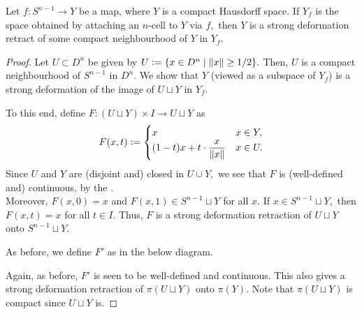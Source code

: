 \documentclass[12pt]{article}
\begin{document}
\begin{prop} \label{prop:lem217}
	Let $f:S^{n-1} \to Y$ be a map, where $Y$ is a compact Hausdorff space. If $Y_f$ is the space obtained by attaching an $n$-cell to $Y$ via $f,$ then $Y$ is a strong deformation retract of some compact neighbourhood of $Y$ in $Y_f.$
\end{prop}
\begin{proof} 
	Let $U \subset D^n$ be given by $U \vcentcolon= \{x \in D^n \mid \|x\| \ge 1/2\}.$ Then, $U$ is a compact neighbourhood of $S^{n-1}$ in $D^n.$ We show that $Y$ (viewed as a subspace of $Y_f$) is a strong deformation of the image of $U \sqcup Y$ in $Y_f.$ 

	To this end, define $F : (U \sqcup Y) \times I \to U \sqcup Y$ as
	\begin{equation*} 
		F(x, t) \vcentcolon= \begin{cases}
			x & x \in Y,\\
			(1 - t)x + t\cdot\dfrac{x}{\|x\|} & x \in U.
		\end{cases}
	\end{equation*}	
	Since $U$ and $Y$ are (disjoint and) closed in $U \cup Y,$ we see that $F$ is (well-defined and) continuous, by the .\\
	Moreover, $F(x, 0) = x$ and $F(x, 1) \in S^{n-1} \sqcup Y$ for all $x.$ If $x \in S^{n-1} \sqcup Y,$ then $F(x, t) = x$ for all $t \in I.$ Thus, $F$ is a strong deformation retraction of $U \sqcup Y$ onto $S^{n - 1} \sqcup Y.$

	As before, we define $F'$ as in the below diagram.

	\begin{center}
	\end{center}

	Again, as before, $F'$ is seen to be well-defined and continuous. This also gives a strong deformation retraction of $\pi(U \sqcup Y)$ onto $\pi(Y).$ Note that $\pi(U \sqcup Y)$ is compact since $U \sqcup Y$ is.
\end{proof}
\end{document}
